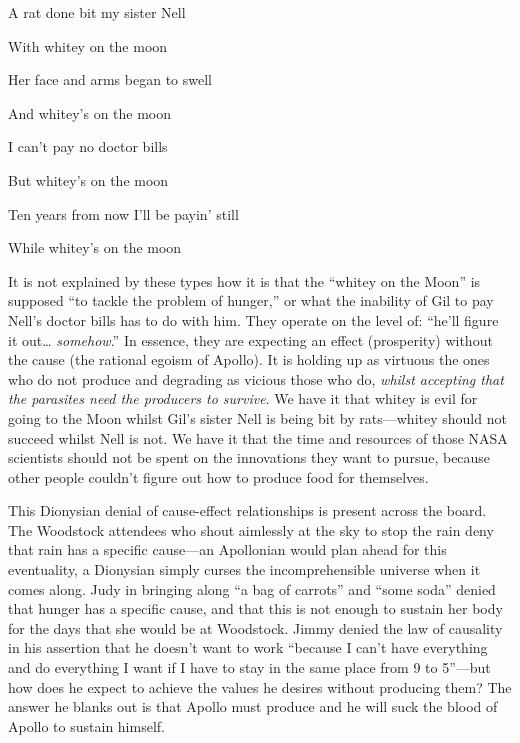 \documentclass[11pt]{article}
\begin{document}
\newpage

\begin{center}
A rat done bit my sister Nell

With whitey on the moon

Her face and arms began to swell

And whitey's on the moon

I can't pay no doctor bills

But whitey's on the moon

Ten years from now I'll be payin' still

While whitey's on the moon
\end{center}

It is not explained by these types how it is that the ``whitey on the Moon'' is supposed ``to tackle the problem of hunger,'' or what the inability of Gil to pay Nell's doctor bills has to do with him. They operate on the level of: ``he'll figure it out\ldots{} \emph{somehow}.'' In essence, they are expecting an effect (prosperity) without the cause (the rational egoism of Apollo). It is holding up as virtuous the ones who do not produce and degrading as vicious those who do, \emph{whilst accepting that the parasites need the producers to survive}. We have it that whitey is evil for going to the Moon whilst Gil's sister Nell is being bit by rats---whitey should not succeed whilst Nell is not. We have it that the time and resources of those NASA scientists should not be spent on the innovations they want to pursue, because other people couldn't figure out how to produce food for themselves.

This Dionysian denial of cause-effect relationships is present across the board. The Woodstock attendees who shout aimlessly at the sky to stop the rain deny that rain has a specific cause---an Apollonian would plan ahead for this eventuality, a Dionysian simply curses the incomprehensible universe when it comes along. Judy in bringing along ``a bag of carrots'' and ``some soda'' denied that hunger has a specific cause, and that this is not enough to sustain her body for the days that she would be at Woodstock. Jimmy denied the law of causality in his assertion that he doesn't want to work ``because I can't have everything and do everything I want if I have to stay in the same place from 9 to 5''---but how does he expect to achieve the values he desires without producing them? The answer he blanks out is that Apollo must produce and he will suck the blood of Apollo to sustain himself.
\end{document}
